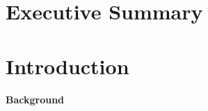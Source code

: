 \documentclass[12pt]{article}
\begin{document}
\newpage
\section*{Executive Summary} 



\newpage
\tableofcontents




\newpage
\listoffigures


\newpage
\listoftables





\newpage
{}
\section{Introduction}
\paragraph{Background}
\end{document}
